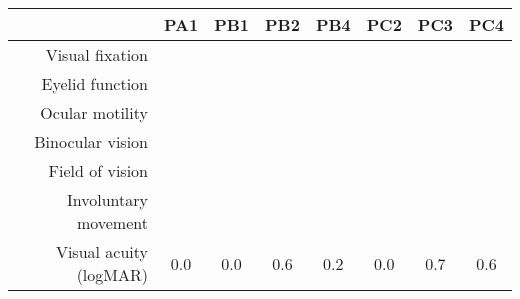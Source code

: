 \footnotesize
\let\oldarraystretch\arraystretch
\renewcommand{\arraystretch}{2}
\newcommand{\skill}{\cellcolor{lightgray}}
\newcommand{\noskill}{\cellcolor{accent1}\textcolor{muteblack}{\BigCross}}
\newcommand{\snoskill}{\cellcolor{accent2}\textcolor{muteblack}{\BigDiamondshape}}
\begin{tabular}{r|ccccccc}
                          & PA1      & PB1      & PB2       & PB4      & PC2       & PC3       & PC4 \\ \hline
  Visual fixation         & \noskill & \noskill & \noskill  & \noskill & \noskill  & \noskill  & \noskill \\
  Eyelid function         & \skill   & \skill   & \skill    & \skill   &  \skill  & \noskill  & \noskill \\
  Ocular motility         & \skill   & \noskill & \skill    & \noskill & \snoskill & \snoskill & \noskill\\
  Binocular vision        & \skill   & \skill   & \skill    & \skill   & \noskill  & \snoskill & \snoskill \\
  Field of vision         & \skill   & \skill   & \skill    & \skill   & \skill    & \noskill  & \noskill \\
  Involuntary movement    & \skill   & \noskill & \snoskill  & \noskill &  \noskill  & \noskill  & \skill \\ \hline
  Visual acuity (logMAR)  & 0.0      & 0.0      & 0.6       & 0.2      & 0.0       & 0.7  & 0.6\\
\end{tabular}
